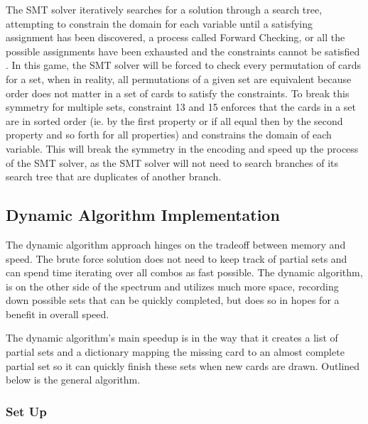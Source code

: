 \documentclass[pageno]{jpaper}
\begin{document}
The SMT solver iteratively searches for a solution through a search tree, attempting to constrain the domain for each variable until a satisfying assignment has been discovered, a process called Forward Checking, or all the possible assignments have been exhausted and the constraints cannot be satisfied \cite{search_from_AI}. In this game, the SMT solver will be forced to check every permutation of cards for a set, when in reality, all permutations of a given set are equivalent because order does not matter in a set of cards to satisfy the constraints. To break this symmetry for multiple sets, constraint 13 and 15 enforces that the cards in a set are in sorted order (ie. by the first property or if all equal then by the second property and so forth for all properties) and constrains the domain of each variable. This will break the symmetry in the encoding and speed up the process of the SMT solver, as the SMT solver will not need to search branches of its search tree that are duplicates of another branch. 

\subsection{Dynamic Algorithm Implementation}

The dynamic algorithm approach hinges on the tradeoff between memory and speed. The brute force solution does not need to keep track of partial sets and can spend time iterating over all combos as fast possible. The dynamic algorithm, is on the other side of the spectrum and utilizes much more space, recording down possible sets that can be quickly completed, but does so in hopes for a benefit in overall speed. 

The dynamic algorithm's main speedup is in the way that it creates a list of partial sets and a dictionary mapping the missing card to an almost complete partial set so it can quickly finish these sets when new cards are drawn. Outlined below is the general algorithm. 

\subsubsection{Set Up}
\end{document}
